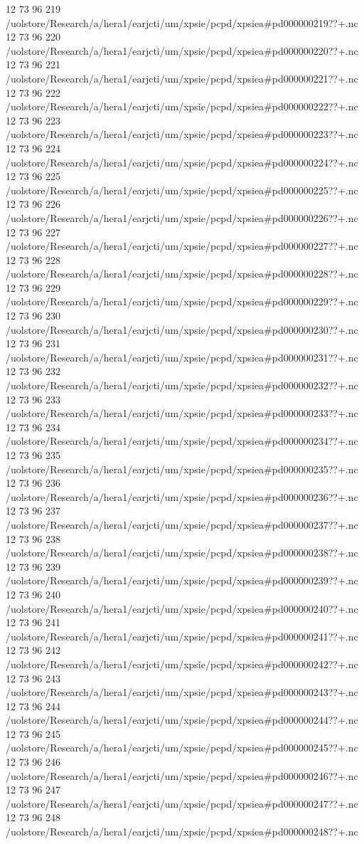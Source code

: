 12 73 96
219
/uolstore/Research/a/hera1/earjcti/um/xpsie/pcpd/xpsiea#pd000000219??+.nc
12 73 96
220
/uolstore/Research/a/hera1/earjcti/um/xpsie/pcpd/xpsiea#pd000000220??+.nc
12 73 96
221
/uolstore/Research/a/hera1/earjcti/um/xpsie/pcpd/xpsiea#pd000000221??+.nc
12 73 96
222
/uolstore/Research/a/hera1/earjcti/um/xpsie/pcpd/xpsiea#pd000000222??+.nc
12 73 96
223
/uolstore/Research/a/hera1/earjcti/um/xpsie/pcpd/xpsiea#pd000000223??+.nc
12 73 96
224
/uolstore/Research/a/hera1/earjcti/um/xpsie/pcpd/xpsiea#pd000000224??+.nc
12 73 96
225
/uolstore/Research/a/hera1/earjcti/um/xpsie/pcpd/xpsiea#pd000000225??+.nc
12 73 96
226
/uolstore/Research/a/hera1/earjcti/um/xpsie/pcpd/xpsiea#pd000000226??+.nc
12 73 96
227
/uolstore/Research/a/hera1/earjcti/um/xpsie/pcpd/xpsiea#pd000000227??+.nc
12 73 96
228
/uolstore/Research/a/hera1/earjcti/um/xpsie/pcpd/xpsiea#pd000000228??+.nc
12 73 96
229
/uolstore/Research/a/hera1/earjcti/um/xpsie/pcpd/xpsiea#pd000000229??+.nc
12 73 96
230
/uolstore/Research/a/hera1/earjcti/um/xpsie/pcpd/xpsiea#pd000000230??+.nc
12 73 96
231
/uolstore/Research/a/hera1/earjcti/um/xpsie/pcpd/xpsiea#pd000000231??+.nc
12 73 96
232
/uolstore/Research/a/hera1/earjcti/um/xpsie/pcpd/xpsiea#pd000000232??+.nc
12 73 96
233
/uolstore/Research/a/hera1/earjcti/um/xpsie/pcpd/xpsiea#pd000000233??+.nc
12 73 96
234
/uolstore/Research/a/hera1/earjcti/um/xpsie/pcpd/xpsiea#pd000000234??+.nc
12 73 96
235
/uolstore/Research/a/hera1/earjcti/um/xpsie/pcpd/xpsiea#pd000000235??+.nc
12 73 96
236
/uolstore/Research/a/hera1/earjcti/um/xpsie/pcpd/xpsiea#pd000000236??+.nc
12 73 96
237
/uolstore/Research/a/hera1/earjcti/um/xpsie/pcpd/xpsiea#pd000000237??+.nc
12 73 96
238
/uolstore/Research/a/hera1/earjcti/um/xpsie/pcpd/xpsiea#pd000000238??+.nc
12 73 96
239
/uolstore/Research/a/hera1/earjcti/um/xpsie/pcpd/xpsiea#pd000000239??+.nc
12 73 96
240
/uolstore/Research/a/hera1/earjcti/um/xpsie/pcpd/xpsiea#pd000000240??+.nc
12 73 96
241
/uolstore/Research/a/hera1/earjcti/um/xpsie/pcpd/xpsiea#pd000000241??+.nc
12 73 96
242
/uolstore/Research/a/hera1/earjcti/um/xpsie/pcpd/xpsiea#pd000000242??+.nc
12 73 96
243
/uolstore/Research/a/hera1/earjcti/um/xpsie/pcpd/xpsiea#pd000000243??+.nc
12 73 96
244
/uolstore/Research/a/hera1/earjcti/um/xpsie/pcpd/xpsiea#pd000000244??+.nc
12 73 96
245
/uolstore/Research/a/hera1/earjcti/um/xpsie/pcpd/xpsiea#pd000000245??+.nc
12 73 96
246
/uolstore/Research/a/hera1/earjcti/um/xpsie/pcpd/xpsiea#pd000000246??+.nc
12 73 96
247
/uolstore/Research/a/hera1/earjcti/um/xpsie/pcpd/xpsiea#pd000000247??+.nc
12 73 96
248
/uolstore/Research/a/hera1/earjcti/um/xpsie/pcpd/xpsiea#pd000000248??+.nc
